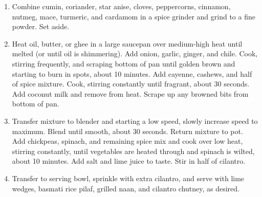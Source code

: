 \begin{enumerate}
    \item Combine cumin, coriander, star anise, cloves, peppercorns, cinnamon, nutmeg, mace, turmeric, and cardamom in a spice grinder and grind to a fine powder. Set aside.
    \item Heat oil, butter, or ghee in a large saucepan over medium-high heat until melted (or until oil is shimmering). Add onion, garlic, ginger, and chile. Cook, stirring frequently, and scraping bottom of pan until golden brown and starting to burn in spots, about 10 minutes. Add cayenne, cashews, and half of spice mixture. Cook, stirring constantly until fragrant, about 30 seconds. Add coconut milk and remove from heat. Scrape up any browned bits from bottom of pan.
    \item Transfer mixture to blender and starting a low speed, slowly increase speed to maximum. Blend until smooth, about 30 seconds. Return mixture to pot. Add chickpeas, spinach, and remaining spice mix and cook over low heat, stirring constantly, until vegetables are heated through and spinach is wilted, about 10 minutes. Add salt and lime juice to taste. Stir in half of cilantro.
    \item Transfer to serving bowl, sprinkle with extra cilantro, and serve with lime wedges, basmati rice pilaf, grilled naan, and cilantro chutney, as desired.

\end{enumerate}
